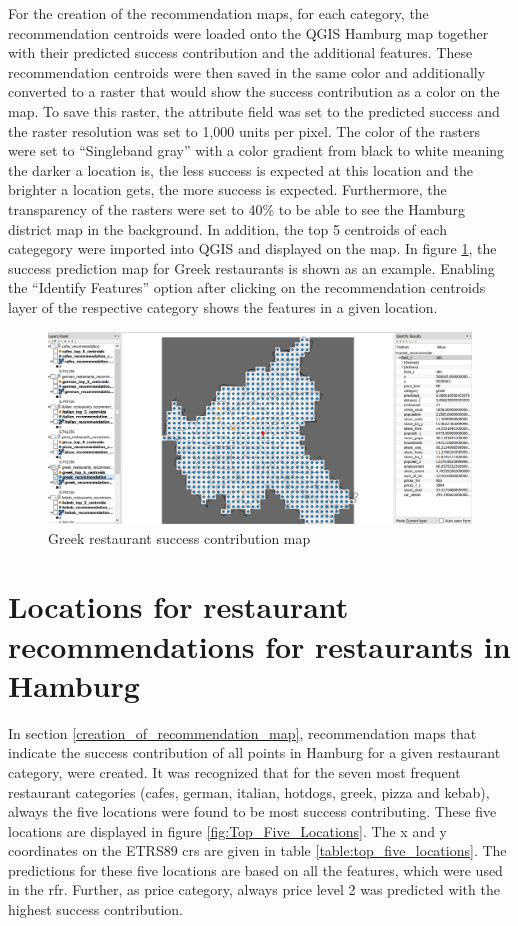 \documentclass[a4paper, 11pt, oneside]{Thesis}  %
\begin{document}
For the creation of the recommendation maps, for each category, the recommendation centroids were loaded onto the QGIS Hamburg map together with their predicted success contribution and the additional features. These recommendation centroids were then saved in the same color and additionally converted to a raster that would show the success contribution as a color on the map. To save this raster, the attribute field was set to the predicted success and the raster resolution was set to 1,000 units per pixel. The color of the rasters were set to ``Singleband gray'' with a color gradient from black to white meaning the darker a location is, the less success is expected at this location and the brighter a location gets, the more success is expected. Furthermore, the transparency of the rasters were set to 40\% to be able to see the Hamburg district map in the background. In addition, the top 5 centroids of each categegory were imported into QGIS and displayed on the map. In figure \ref{fig:Greek_restaurant_success_contribution_map}, the success prediction map for Greek restaurants is shown as an example. Enabling the ``Identify Features'' option after clicking on the recommendation centroids layer of the respective category shows the features in a given location.

\begin{figure}[h]
\includegraphics[scale=0.5]{Figures/Recommendation_map/greek_restaurant_recommendation_map.png}
\centering
\caption{Greek restaurant success contribution map}
\label{fig:Greek_restaurant_success_contribution_map}
\end{figure}

\section{Locations for restaurant recommendations for restaurants in Hamburg}

In section \ref{creation_of_recommendation_map}, recommendation maps that indicate the success contribution of all points in Hamburg for a given restaurant category, were created. It was recognized that for the seven most frequent restaurant categories (cafes, german, italian, hotdogs, greek, pizza and kebab), always the five locations were found to be most success contributing. These five locations are displayed in figure \ref{fig:Top_Five_Locations}. The x and y coordinates on the ETRS89 \ac{crs} are given in table \ref{table:top_five_locations}. The predictions for these five locations are based on all the features, which were used in the \ac{rfr}. Further, as price category, always price level 2 was predicted with the highest success contribution.
\end{document}
